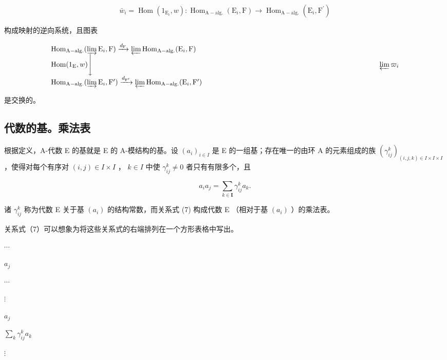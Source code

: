 \[
\bar {w} _ {i} = \operatorname{Hom} (1 _ {\mathrm{E} _ {i}}, w): \operatorname{Hom} _ {\mathrm{A-alg.}} (\mathrm{E} _ {i}, \mathrm{F}) \rightarrow \operatorname{Hom} _ {\mathrm{A-alg.}} (\mathrm{E} _ {i}, \mathrm{F} ^ {\prime})
\]

构成映射的逆向系统，且图表

\[
\begin{array}{l} \operatorname{Hom} _ {\mathrm{A-alg.}} (\varinjlim \mathrm{E} _ {i}, \mathrm{F}) \xrightarrow {d _ {\mathrm{F}}} \varprojlim \operatorname{Hom} _ {\mathrm{A-alg.}} (\mathrm{E} _ {i}, \mathrm{F}) \\ \operatorname{Hom} (1 _ {\mathrm{E}}, w) \Biggl \downarrow \qquad \qquad \qquad \qquad \qquad \qquad \qquad \qquad \qquad \qquad \qquad \qquad \qquad \qquad \qquad \qquad \qquad \qquad \qquad \qquad \varprojlim \varpi_ {i} \\ \operatorname{Hom} _ {\mathrm{A-alg.}} (\varinjlim \mathrm{E} _ {i}, \mathrm{F} ^ {\prime}) \xrightarrow {d _ {\mathrm{F} ^ {\prime}}} \varprojlim \operatorname{Hom} _ {\mathrm{A-alg.}} (\mathrm{E} _ {i}, \mathrm{F} ^ {\prime}) \end{array}
\]

是交换的。

\subsection{代数的基。乘法表}

根据定义，A-代数 E 的基就是 E 的 A-模结构的基。设 \((a_{i})_{i\in I}\) 是 E 的一组基；存在唯一的由环 A 的元素组成的族 \((\gamma_{ij}^{k})_{(i,j,k)\in I\times I\times I}\) ，使得对每个有序对 \((i,j)\in I\times I\) ， \(k\in I\) 中使 \(\gamma_{ij}^{k}\neq 0\) 者只有有限多个，且

\[
a _ {i} a _ {j} = \sum_ {k \in \mathbf {I}} \gamma_ {i j} ^ {k} a _ {k}.\tag{7}
\]

诸 \(\gamma_{ij}^{k}\) 称为代数 E 关于基 \((a_{i})\) 的结构常数，而关系式 (7) 构成代数 E （相对于基 \((a_{i})\) ）的乘法表。

关系式（7）可以想象为将这些关系式的右端排列在一个方形表格中写出。

\(\cdots\)

\(a_j\)

\(\cdots\)

\(\vdots\)

\(a_j\)

\(\sum_{k} \gamma_{ij}^{k} a_k\)

\(\vdots\)

